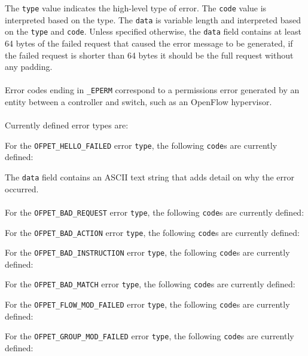 
The \verb|type| value indicates the high-level type of error.  The \verb|code| value is interpreted based on the type.  The \verb|data| is variable length and interpreted based on the \verb|type| and \verb|code|. Unless specified otherwise, the \verb|data| field contains at least 64 bytes of the failed request that caused the error message to be generated, if the failed request is shorter than 64 bytes it should be the full request without any padding.
\\\\
Error codes ending in \verb|_EPERM| correspond to a permissions error generated by an entity between a controller and switch, such as an OpenFlow hypervisor. 
\\\\
Currently defined error types are:


For the \verb|OFPET_HELLO_FAILED| error \verb|type|, the following \verb|code|s are currently defined:


The \verb|data| field contains an ASCII text string that adds detail on why the error occurred.
\\\\
For the \verb|OFPET_BAD_REQUEST| error \verb|type|, the following \verb|code|s are currently defined:



For the \verb|OFPET_BAD_ACTION| error \verb|type|, the following \verb|code|s are currently defined:



For the \verb|OFPET_BAD_INSTRUCTION| error \verb|type|, the following \verb|code|s are currently defined:



For the \verb|OFPET_BAD_MATCH| error \verb|type|, the following \verb|code|s are currently defined:



For the \verb|OFPET_FLOW_MOD_FAILED| error \verb|type|, the following \verb|code|s are currently defined:



For the \verb|OFPET_GROUP_MOD_FAILED| error \verb|type|, the following \verb|code|s are currently defined:



